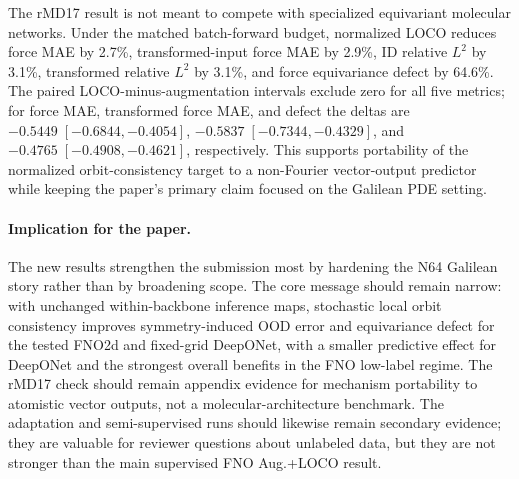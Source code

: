 \begin{table}[t]
\centering
\small
\caption{rMD17 ethanol force-prediction mechanism check at 500 labeled conformations. Both methods use 48 batch-level model evaluations per epoch. Entries are mean \(\pm\) sample standard deviation over five matched seeds; transformed inputs use the training action distribution.}
\label{tab:new-rmd17-ethanol-500}
\end{table}

The rMD17 result is not meant to compete with specialized equivariant molecular networks. Under the matched batch-forward budget, normalized LOCO reduces force MAE by 2.7\%, transformed-input force MAE by 2.9\%, ID relative \(L^2\) by 3.1\%, transformed relative \(L^2\) by 3.1\%, and force equivariance defect by 64.6\%. The paired LOCO-minus-augmentation intervals exclude zero for all five metrics; for force MAE, transformed force MAE, and defect the deltas are \(-0.5449\;[-0.6844,-0.4054]\), \(-0.5837\;[-0.7344,-0.4329]\), and \(-0.4765\;[-0.4908,-0.4621]\), respectively. This supports portability of the normalized orbit-consistency target to a non-Fourier vector-output predictor while keeping the paper's primary claim focused on the Galilean PDE setting.

\paragraph{Implication for the paper.} The new results strengthen the submission most by hardening the N64 Galilean story rather than by broadening scope. The core message should remain narrow: with unchanged within-backbone inference maps, stochastic local orbit consistency improves symmetry-induced OOD error and equivariance defect for the tested FNO2d and fixed-grid DeepONet, with a smaller predictive effect for DeepONet and the strongest overall benefits in the FNO low-label regime. The rMD17 check should remain appendix evidence for mechanism portability to atomistic vector outputs, not a molecular-architecture benchmark. The adaptation and semi-supervised runs should likewise remain secondary evidence; they are valuable for reviewer questions about unlabeled data, but they are not stronger than the main supervised FNO Aug.+LOCO result.
